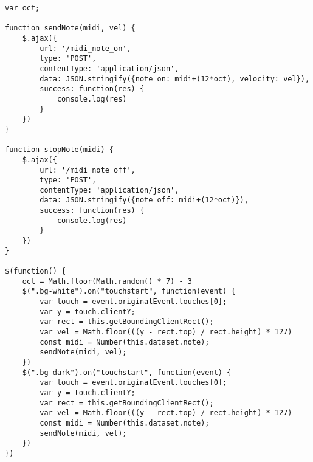 \documentclass[../main.tex]{subfiles}
\begin{document}
\begin{verbatim}
var oct;

function sendNote(midi, vel) {
    $.ajax({
        url: '/midi_note_on',
        type: 'POST',
        contentType: 'application/json',
        data: JSON.stringify({note_on: midi+(12*oct), velocity: vel}),
        success: function(res) {
            console.log(res)
        }
    })
}

function stopNote(midi) {
    $.ajax({
        url: '/midi_note_off',
        type: 'POST',
        contentType: 'application/json',
        data: JSON.stringify({note_off: midi+(12*oct)}),
        success: function(res) {
            console.log(res)
        }
    })
}

$(function() {
    oct = Math.floor(Math.random() * 7) - 3
    $(".bg-white").on("touchstart", function(event) {
        var touch = event.originalEvent.touches[0];
        var y = touch.clientY;
        var rect = this.getBoundingClientRect();
        var vel = Math.floor(((y - rect.top) / rect.height) * 127)
        const midi = Number(this.dataset.note);
        sendNote(midi, vel);
    })
    $(".bg-dark").on("touchstart", function(event) {
        var touch = event.originalEvent.touches[0];
        var y = touch.clientY;
        var rect = this.getBoundingClientRect();
        var vel = Math.floor(((y - rect.top) / rect.height) * 127)
        const midi = Number(this.dataset.note);
        sendNote(midi, vel);
    })
})
\end{verbatim}
\end{document}
